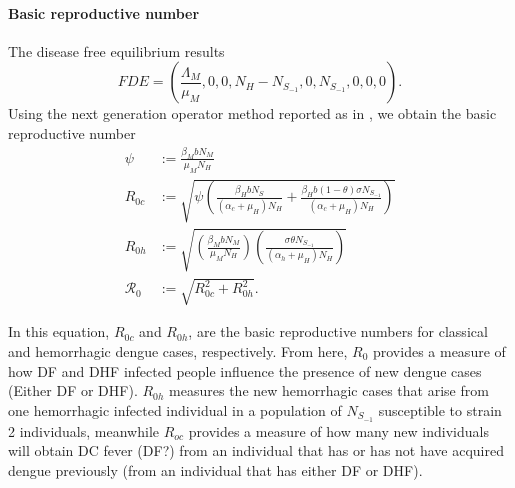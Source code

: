 \paragraph{Basic reproductive number}
    The disease free equilibrium results
$$
    FDE=
    \left(
        \frac{\Lambda_M}{\mu_M},
        0,
        0,
        N_H - N_{S_{-1}},
        0,
        N_{S_{-1}},
        0,
        0,
        0
    \right).
$$
Using the next generation operator method 
reported as in \cite{Feng1997a}, we obtain
the basic reproductive number
%
\begin{equation}
    \begin{aligned}
        \psi &:= \frac{\beta_MbN_M}{\mu_MN_H}
        \\
        R_{0c} & := \sqrt{
            \psi
            \left(
                \frac{\beta_HbN_S}{ (\alpha_c + \mu_H)N_H}
                +
                \frac{\beta_Hb(1- \theta ) \sigma N_{S_{-1}}}{ (\alpha_c + \mu_H)N_H}
            \right)}
        \\
        R_{0h}& :=\sqrt{
            \left(\frac{\beta_MbN_M}{\mu_MN_H}\right)
                \left(\frac{
                    \sigma \theta N_{S_{-1}}
                }{(\alpha_h + \mu_H)N_H}\right)}
    \\
    \mathcal{R}_0 & :=
            \sqrt{ R_{0c}^2+R_{0h}^2 }.
    \end{aligned}
\end{equation}

        In this equation, $R_{0c}$ and $R_{0h}$, are the basic reproductive numbers 
    for classical and hemorrhagic dengue cases, respectively. From here, $R_0$ 
    provides a measure of how DF and DHF infected people influence the presence of 
    new dengue cases (Either DF or DHF). $R_{0h}$ measures the new hemorrhagic 
    cases that arise from one hemorrhagic infected individual in a population of 
    $N_{S_{-1}}$ susceptible to strain 2 individuals, meanwhile $R_{oc}$ provides a 
    measure of how many new individuals will obtain DC fever (DF?) from an individual 
    that has or has not have acquired dengue previously (from an individual that has either
    DF or DHF).

